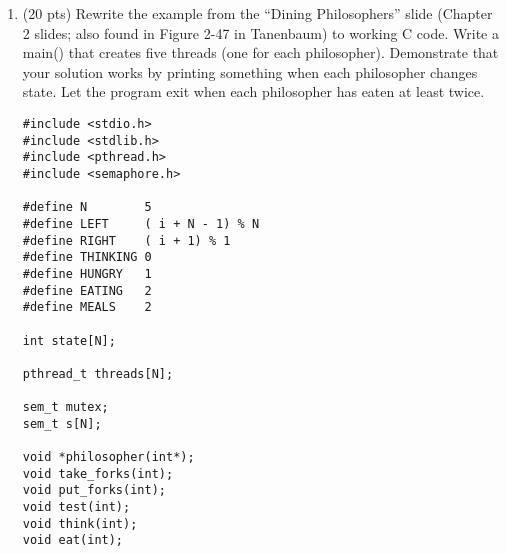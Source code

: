 \documentclass[12pt]{article}
\begin{document}
\begin{enumerate}
\begin{Verbatim}[fontsize = \scriptsize]
  pthread_create(&thread1,NULL,f1,1);
  pthread_create(&thread2,NULL,f1,2);
  pthread_create(&thread3,NULL,f1,3);
  pthread_join(thread1, NULL);
  pthread_join(thread2, NULL);
  pthread_join(thread3, NULL);

  return 0;
}

void *f1(int x)
{
  while(cycles < NUM_THREADS)
  {
    //Rendezvous
    sem_wait(&mutex);
    count++;
    if(count == NUM_THREADS)
    {
      sem_wait(&turnstile2);
      sem_post(&turnstile1);
    }
    sem_post(&mutex);
    sem_wait(&turnstile1);


    //Critical point
    if(cycles + 1 == x)
    {
      printf("%d\n", x);
      cycles++;
    }
    
    sem_post(&turnstile1);
    //Rendezvous part 2
    sem_wait(&mutex);
    count--;
    if(count == 0)
    {
      sem_wait(&turnstile1);
      sem_post(&turnstile2);
    }
    sem_post(&mutex);
    sem_wait(&turnstile2);
    sem_post(&turnstile2);
  }
  pthread_exit(0);
}

  \end{Verbatim}

  This is a general solution for any known number of threads. It is a reusable barrier modifed to
  allow single access to a critical section, where the number is printed if it is the correct
  number. When all the numbers have been printed, the loop terminates, and all the threads are
  released.

\item (20 pts) Rewrite the example from the ``Dining Philosophers''
slide (Chapter 2 slides; also found in Figure 2-47 in Tanenbaum)
to working C code. Write a main() that creates five threads (one
for each philosopher). Demonstrate that your solution works by
printing something when each philosopher changes state. Let the
program exit when each philosopher has eaten at least twice. 

\begin{Verbatim}[fontsize = \scriptsize]
#include <stdio.h>
#include <stdlib.h>
#include <pthread.h>
#include <semaphore.h>

#define N        5
#define LEFT     ( i + N - 1) % N
#define RIGHT    ( i + 1) % 1
#define THINKING 0
#define HUNGRY   1
#define EATING   2
#define MEALS    2

int state[N];

pthread_t threads[N];

sem_t mutex;
sem_t s[N];

void *philosopher(int*);
void take_forks(int);
void put_forks(int);
void test(int);
void think(int);
void eat(int);


\end{Verbatim}
\end{enumerate}
\end{document}
